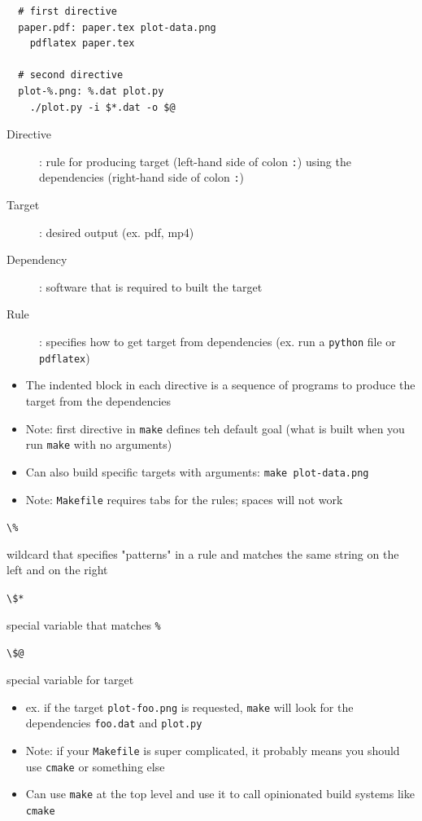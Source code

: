 \documentclass[letterpaper,12pt]{article}
\newcommand*{\lstitem}[1]{
  \setbox0\hbox{\lstinline{#1}}
  \item[\usebox0]
}
\begin{document}
\begin{lstlisting}
  # first directive
  paper.pdf: paper.tex plot-data.png
    pdflatex paper.tex

  # second directive
  plot-%.png: %.dat plot.py
    ./plot.py -i $*.dat -o $@
\end{lstlisting}

\begin{description}
 \item[Directive]: rule for producing target (left-hand side of colon \lstinline{:})  using the dependencies (right-hand side of colon \lstinline{:})
 \item[Target]: desired output (ex. pdf, mp4)
 \item[Dependency]: software that is required to built the target
 \item[Rule]: specifies how to get target from dependencies (ex. run a \lstinline{python} file or \lstinline{pdflatex})
\end{description}

\begin{itemize}
 \item The indented block in each directive is a sequence of programs to produce the target from the dependencies
 \item Note: first directive in \lstinline{make} defines teh default goal (what is built when you run \lstinline{make} with no arguments)
 \item Can also build specific targets with arguments: \lstinline{make plot-data.png}
 \item Note: \lstinline{Makefile} requires tabs for the rules; spaces will not work
\end{itemize}

\begin{description}
 \lstitem{\%} wildcard that specifies "patterns" in a rule and matches the same string on the left and on the right
 \lstitem{\$*} special variable that matches \lstinline{%}
 \lstitem{\$@} special variable for target
\end{description}

\begin{itemize}
 \item ex. if the target \lstinline{plot-foo.png} is requested, \lstinline{make} will look for the dependencies \lstinline{foo.dat} and \lstinline{plot.py}
 \item Note: if your \lstinline{Makefile} is super complicated, it probably means you should use \lstinline{cmake} or something else
 \item Can use \lstinline{make} at the top level and use it to call opinionated build systems like \lstinline{cmake}
\end{itemize}
\end{document}
